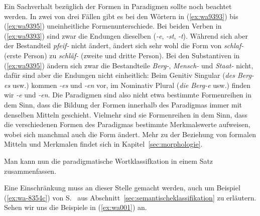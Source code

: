 Ein Sachverhalt bezüglich der Formen in Paradigmen sollte noch beachtet werden.
In zwei von drei Fällen gibt es bei den Wörtern in (\ref{ex:wa9393}) bis (\ref{ex:wa9395}) uneinheitliche Formenunterschiede.
Bei beiden Verben in (\ref{ex:wa9393}) sind zwar die Endungen dieselben (\textit{-e}, \textit{-st}, \textit{-t}).
Während sich aber der Bestandteil \textit{pfeif-} nicht ändert, ändert sich sehr wohl die Form von \textit{schlaf-} (erste Person) zu \textit{schläf-} (zweite und dritte Person).
Bei den Substantiven in (\ref{ex:wa9395}) ändern sich zwar die Bestandteile \textit{Berg-}, \textit{Mensch-} und \textit{Staat-} nicht, dafür sind aber die Endungen nicht einheitlich:
Beim Genitiv Singular (\textit{des Berg-es} usw.) kommen \textit{-es} und \textit{-en} vor, im Nominativ Plural (\textit{die Berg-e} usw.) finden wir \textit{-e} und \textit{-en}.
Die Paradigmen sind also nicht etwa bestimmte Formenreihen in dem Sinn, dass die Bildung der Formen innerhalb des Paradigmas immer mit denselben Mitteln geschieht.
Vielmehr sind sie Formenreihen in dem Sinn, dass die verschiedenen Formen des Paradigmas bestimmte Merkmalswerte aufweisen, wobei sich manchmal auch die Form ändert.
Mehr zu der Beziehung von formalen Mitteln und Merkmalen findet sich in Kapitel~\ref{sec:morphologie}.


Man kann nun die paradigmatische Wortklassifkation in einem Satz zusammenfassen.



Eine Einschränkung muss an dieser Stelle gemacht werden, auch um Beispiel (\ref{ex:wa-8354c}) von S.~\pageref{ex:wa-8354c} aus Abschnitt~\ref{sec:semantischeklassifikation} zu erläutern.
Sehen wir uns die Beispiele in (\ref{ex:wa001}) an.

\begin{exe}
  \ex\label{ex:wa001}\begin{xlist}
  \end{xlist}
\end{exe}

